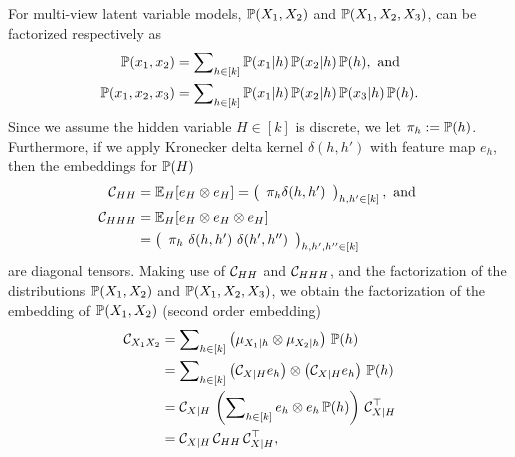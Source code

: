 \documentclass{article}
\begin{document}
For multi-view latent variable models, $\mathbb{P}(X_1,X_2)$ and $\mathbb{P}(X_1,X_2,X_3)$, can be factorized respectively as
\begin{align*}
	\mathbb{P}(x_1, x_2) &= \sum\nolimits_{h \in [k]} \mathbb{P}(x_1 | h )\, \mathbb{P}(x_2 | h)\, \mathbb{P}(h),~\text{and}\\
	\mathbb{P}(x_1, x_2, x_3) &= \sum\nolimits_{h \in [k]} \mathbb{P}(x_1 | h )\, \mathbb{P}(x_2 | h)\, \mathbb{P}(x_3 | h)\, \mathbb{P}(h).
\end{align*}
Since we assume the hidden variable $H \in [k]$ is discrete,
we let $\pi_h:=\mathbb{P}(h)$. Furthermore, if we apply Kronecker delta kernel $\delta(h,h')$ with feature map $e_h$, then the embeddings for $\mathbb{P}(H)$
\begin{align*}
 \mathcal{C}_{HH} &= \mathbb{E}_H[e_H \otimes e_H] = \left(
  \begin{array}{c}
    \pi_h \delta(h, h') \cr
  \end{array}
 \right)_{h,h' \in [k]},
 ~\text{and}~\\
 \mathcal{C}_{HHH} &= \mathbb{E}_H[e_H \otimes e_H \otimes e_H]  \\
	&= \left(
  \begin{array}{c}
    \pi_h\ \delta(h,h')\ \delta(h',h'') \cr
  \end{array}
 \right)_{h,h',h''\in[k]}
\end{align*}
are diagonal tensors. Making use of $\mathcal{C}_{HH}$ and $\mathcal{C}_{HHH}$, and the factorization of the distributions $\mathbb{P}(X_1,X_2)$ and $\mathbb{P}(X_1,X_2,X_3)$, we obtain the factorization of the embedding of
$\mathbb{P}(X_1,X_2)$ (second order embedding)
\begin{align}
  \mathcal{C}_{X_1X_2}
  &= \sum\nolimits_{h \in [k]} \left(\mu_{X_1|h} \otimes \mu_{X_2|h}\right)\,  \mathbb{P}(h) \nonumber \\
  &= \sum\nolimits_{h \in [k]} \left(\mathcal{C}_{X|H} e_h\right) \otimes \left(\mathcal{C}_{X|H} e_h\right)\, \mathbb{P}(h) \nonumber \\
  &= \mathcal{C}_{X|H}\, \left(\sum\nolimits_{h \in [k]} e_h \otimes e_h\, \mathbb{P}(h)\right)\, \mathcal{C}_{X|H}^\top \nonumber \\
  &= \mathcal{C}_{X|H}\, \mathcal{C}_{HH}\, \mathcal{C}_{X|H}^\top, \label{eq:pair_factorization}
\end{align}
\end{document}
